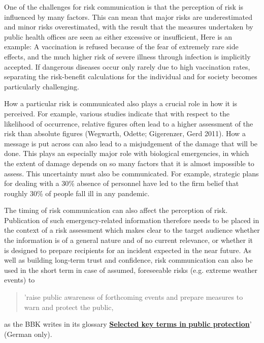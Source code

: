 \documentclass{article}
\begin{document}
One of the challenges for risk communication is that the perception of risk is influenced by many factors. This can mean that major risks are underestimated and minor risks overestimated, with the result that the measures undertaken by public health offices are seen as either excessive or insufficient, Here is an example: A vaccination is refused because of the fear of extremely rare side effects, and the much higher risk of severe illness through infection is implicitly accepted. If dangerous diseases occur only rarely due to high vaccination rates, separating the risk-benefit calculations for the individual and for society becomes particularly challenging.


How a particular risk is communicated also plays a crucial role in how it is perceived. For example, various studies indicate that with respect to the likelihood of occurrence, relative figures often lead to a higher assessment of the risk than absolute figures (Wegwarth, Odette; Gigerenzer, Gerd 2011). How a message is put across can also lead to a misjudgement of the damage that will be done. This plays an especially major role with biological emergencies, in which the extent of damage depends on so many factors that it is almost impossible to assess. This uncertainty must also be communicated. For example, strategic plans for dealing with a 30\% absence of personnel have led to the firm belief that roughly 30\% of people fall ill in any pandemic.


The timing of risk communication can also affect the perception of risk. Publication of such emergency-related information therefore needs to be placed in the context of a risk assessment which makes clear to the target audience whether the information is of a general nature and of no current relevance, or whether it is designed to prepare recipients for an incident expected in the near future. As well as building long-term trust and confidence, risk communication can also be used in the short term in case of assumed, foreseeable risks (e.g. extreme weather events) to

\begin{quote}



'raise public awareness of forthcoming events and prepare measures to warn and protect the public,


\end{quote}


as the BBK writes in its glossary \textbf{\href{https://www.bbk.bund.de/SharedDocs/Downloads/BBK/DE/Publikationen/Praxis_Bevoelkerungsschutz/Glossar_2018.pdf}{Selected key terms in}}\href{https://www.bbk.bund.de/SharedDocs/Downloads/BBK/DE/Publikationen/Praxis_Bevoelkerungsschutz/Glossar_2018.pdf}{ }\textbf{\href{https://www.bbk.bund.de/SharedDocs/Downloads/BBK/DE/Publikationen/Praxis_Bevoelkerungsschutz/Glossar_2018.pdf}{public protection}}' (German only).
\end{document}
